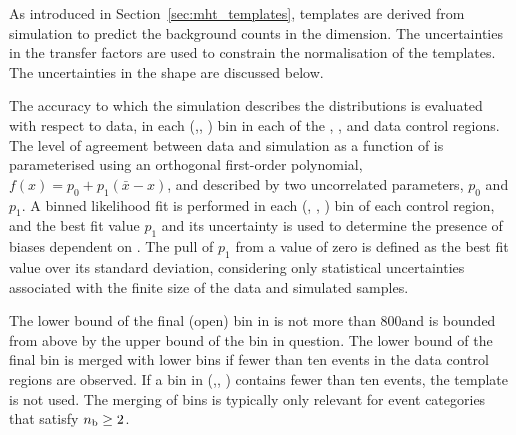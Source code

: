
As introduced in Section~\ref{sec:mht_templates}, templates are
derived from simulation to predict the background counts in the
\HTmiss dimension. The uncertainties in the transfer factors are used
to constrain the normalisation of the \HTmiss templates. The
uncertainties in the \HTmiss shape are discussed below.


The accuracy to which the simulation describes the \HTmiss distributions
is evaluated with respect to data, in each (\njet,\nb, \scalht) bin in
each of the \mj, \mmj, and \gj data control regions. %
The level of agreement between data and simulation as a function of
\HTmiss is parameterised using an orthogonal first-order polynomial,
$f(x) = p_0 + p_1(\bar{x}-x)$, and described by two uncorrelated
parameters, $p_0$ and $p_1$. A binned likelihood fit is performed in
each (\njet, \nb, \scalht) bin of each control region, and the best
fit value $p_1$ and its uncertainty is used to determine the presence
of biases dependent on \HTmiss. The pull of $p_1$ from a value of zero
is defined as the best fit value over its standard deviation,
considering only statistical uncertainties associated with the finite
size of the data and simulated samples.

The lower bound of the final (open) bin in \HTmiss is not more than
800\GeV and is bounded from above by the upper bound of the \scalht
bin in question. The lower bound of the final \HTmiss bin is merged
with lower bins if fewer than ten events in the data control regions
are observed. If a bin in (\njet,\nb, \scalht) contains fewer than ten
events, the \HTmiss template is not used. The merging of bins is
typically only relevant for event categories that satisfy $n_{\text{b}} \geq
2$.


